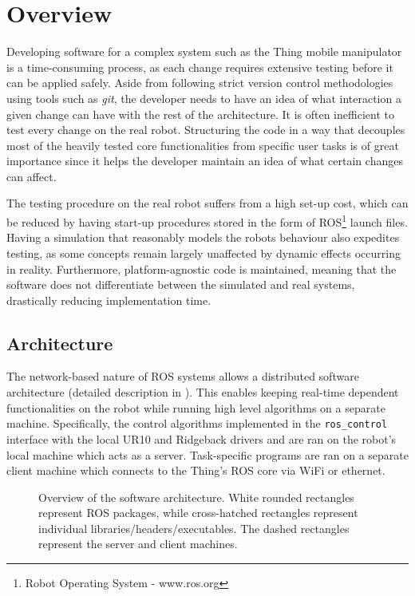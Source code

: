 \documentclass[times, utf8, diplomski, english]{fer}
\begin{document}
\section{Overview}\label{section:overview}
Developing software for a complex system such as the Thing mobile manipulator is a time-consuming process, as each change requires extensive testing before it can be applied safely.
Aside from following strict version control methodologies using tools such as \textit{git}, the developer needs to have an idea of what interaction a given change can have with the rest of the architecture. 
It is often inefficient to test every change on the real robot.
Structuring the code in a way that decouples most of the heavily tested core functionalities from specific user tasks is of great importance since it helps the developer maintain an idea of what certain changes can affect.

The testing procedure on the real robot suffers from a high set-up cost, which can be reduced by having start-up procedures stored in the form of ROS\footnote{Robot Operating System - www.ros.org} launch files.
Having a simulation that reasonably models the robots behaviour also expedites testing, as some concepts remain largely unaffected by dynamic effects occurring in reality.
Furthermore, platform-agnostic code is maintained, meaning that the software does not differentiate between the simulated and real systems, drastically reducing implementation time.
\subsection{Architecture}
The network-based nature of ROS systems allows a distributed software architecture (detailed description in ).
This enables keeping real-time dependent functionalities on the robot while running high level algorithms on a separate machine.
Specifically, the control algorithms implemented in the \verb|ros_control| interface with the local UR10 and Ridgeback drivers and are ran on the robot's local machine which acts as a server.
Task-specific programs are ran on a separate client machine which connects to the Thing's ROS core via WiFi or ethernet.
\begin{figure}

\caption{Overview of the software architecture. White rounded rectangles represent ROS packages, while cross-hatched rectangles represent individual libraries/headers/executables. The dashed rectangles represent the server and client machines.}
\label{fig:overview}
\end{figure} 
\end{document}

